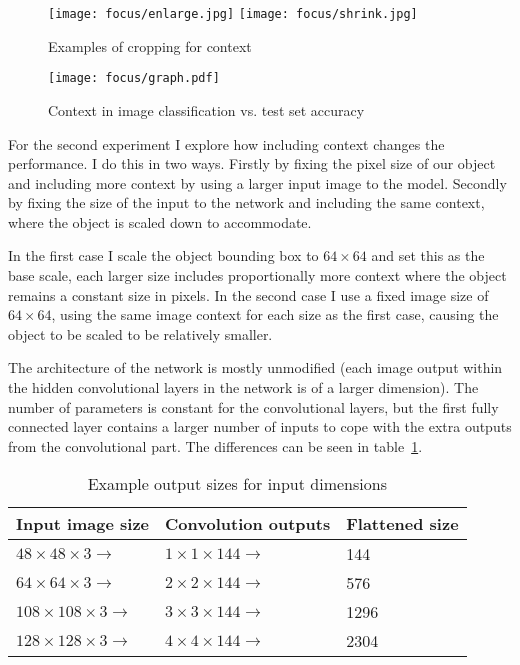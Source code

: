 \begin{figure*}[t]
    \caption{Examples of cropping for context}
\centering
\texttt{[image: focus/enlarge.jpg]}
\texttt{[image: focus/shrink.jpg]}
\label{fig:focus_context}
\end{figure*}




\begin{figure}[h]
    \caption{Context in image classification vs. test set accuracy}
\centering
\texttt{[image: focus/graph.pdf]}
\label{fig:focus_exp2}
\end{figure}

For the second experiment I explore how including context changes the performance. I do this in two ways. Firstly by fixing the pixel size of our object and including more context by using a larger input image to the model. Secondly by fixing the size of the input to the network and including the same context, where the object is scaled down to accommodate.

In the first case I scale the object bounding box to $ 64 \times 64 $ and set this as the base scale, each larger size includes proportionally more context where the object remains a constant size in pixels. In the second case I use a fixed image size of $ 64 \times 64 $, using the same image context for each size as the first case, causing the object to be  scaled to be relatively smaller. 

The architecture of the network is mostly unmodified (each image output within the hidden convolutional layers in the network is of a larger dimension). The number of parameters is constant for the convolutional layers, but the first fully connected layer contains a larger number of inputs to cope with the extra outputs from the convolutional part. The differences can be seen in table~\ref{fig:focus_sizes}.


\begin{table}[h]
  \centering
    \caption{Example output sizes for input dimensions }
\begin{tabular}{ l l l } 
 
 \toprule
 Input image size & Convolution outputs & Flattened size \\
 \toprule
 
 $ 48 \times 48 \times 3 \rightarrow $ & $ 1\times1\times144 \rightarrow $ & 144 \\
 $ 64 \times 64 \times 3 \rightarrow $ & $ 2\times2\times144 \rightarrow $ & 576 \\
 $ 108 \times 108 \times 3 \rightarrow $ & $ 3\times3\times144 \rightarrow $ & 1296 \\
 $ 128 \times 128 \times 3 \rightarrow $ & $ 4\times4\times144 \rightarrow $ & 2304 \\
 
\end{tabular}
\label{fig:focus_sizes}
\end{table}

